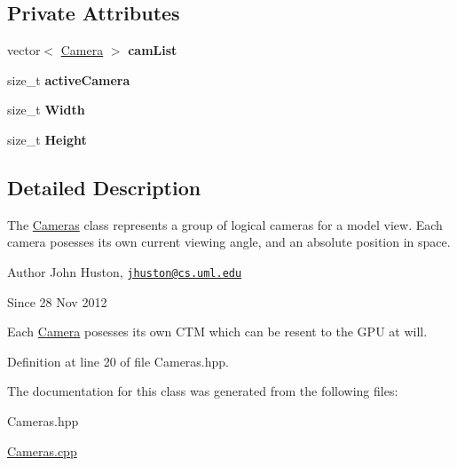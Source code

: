 \subsection*{Private Attributes}
\begin{DoxyCompactItemize}
\item 
\hypertarget{class_cameras_a7411a5eef4362af369217ea8e37cffd3}{vector$<$ \hyperlink{class_camera}{Camera} $>$ {\bfseries cam\-List}}\label{class_cameras_a7411a5eef4362af369217ea8e37cffd3}

\item 
\hypertarget{class_cameras_a3327a3104975b11b6f144ccba0720c49}{size\-\_\-t {\bfseries active\-Camera}}\label{class_cameras_a3327a3104975b11b6f144ccba0720c49}

\item 
\hypertarget{class_cameras_af3a40020076cbdbffbbbddf4b83e6f74}{size\-\_\-t {\bfseries Width}}\label{class_cameras_af3a40020076cbdbffbbbddf4b83e6f74}

\item 
\hypertarget{class_cameras_a073073118b02de2c7c4aa29dcff1587a}{size\-\_\-t {\bfseries Height}}\label{class_cameras_a073073118b02de2c7c4aa29dcff1587a}

\end{DoxyCompactItemize}


\subsection{Detailed Description}
The \hyperlink{class_cameras}{Cameras} class represents a group of logical cameras for a model view. Each camera posesses its own current viewing angle, and an absolute position in space. 

\begin{DoxyAuthor}{Author}
John Huston, \href{mailto:jhuston@cs.uml.edu}{\tt jhuston@cs.\-uml.\-edu} 
\end{DoxyAuthor}
\begin{DoxySince}{Since}
28 Nov 2012
\end{DoxySince}
Each \hyperlink{class_camera}{Camera} posesses its own C\-T\-M which can be resent to the G\-P\-U at will. 

Definition at line 20 of file Cameras.\-hpp.



The documentation for this class was generated from the following files\-:\begin{DoxyCompactItemize}
\item 
Cameras.\-hpp\item 
\hyperlink{_cameras_8cpp}{Cameras.\-cpp}\end{DoxyCompactItemize}
